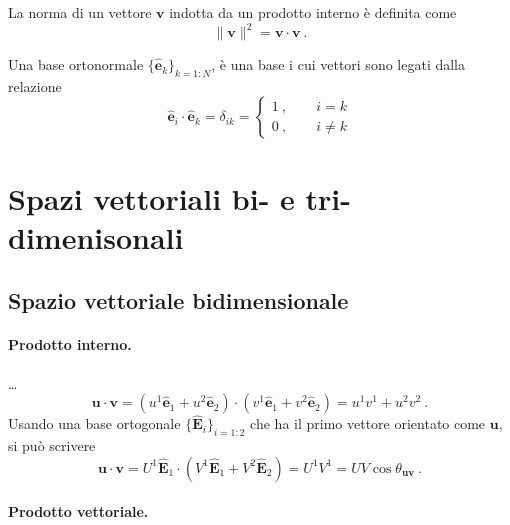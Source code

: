 \begin{definition} La norma di un vettore $\mathbf{v}$ indotta da un prodotto interno è definita come
    \begin{equation}
        \| \mathbf{v} \|^2 = \mathbf{v} \cdot \mathbf{v} \ .
    \end{equation}
\end{definition}

\begin{definition} Una base ortonormale $\{ \mathbf{\hat{e}}_k \}_{k=1:N}$, è una base i cui vettori sono legati dalla relazione
    \begin{equation}
        \mathbf{\hat{e}}_i \cdot \mathbf{\hat{e}}_k = \delta_{ik} =
        \begin{cases} 1 \ , \qquad i = k \\ 0 \ , \qquad i \ne k \end{cases}
    \end{equation}
\end{definition}

\section{Spazi vettoriali bi- e tri-dimenisonali}
\subsection{Spazio vettoriale bidimensionale}
\paragraph{Prodotto interno.}
{\color{red} \dots}
\begin{equation}
    \mathbf{u} \cdot \mathbf{v} =
    ( u^1 \mathbf{\hat{e}}_1 + u^2 \mathbf{\hat{e}}_2) \cdot ( v^1 \mathbf{\hat{e}}_1 + v^2 \mathbf{\hat{e}}_2) = u^1 v^1 + u^2 v^2 \ . 
\end{equation}
Usando una base ortogonale $\{ \mathbf{\hat{E}}_i \}_{i=1:2}$ che ha il primo vettore orientato come $\mathbf{u}$, si può scrivere
\begin{equation}
    \mathbf{u} \cdot \mathbf{v} =
      U^1 \mathbf{\hat{E}}_1 \cdot ( V^1 \mathbf{\hat{E}}_1 + V^2 \mathbf{\hat{E}}_2) = U^1 V^1 = U V \cos \theta_{\mathbf{u} \mathbf{v}} \ . 
\end{equation}
\paragraph{Prodotto vettoriale.}

